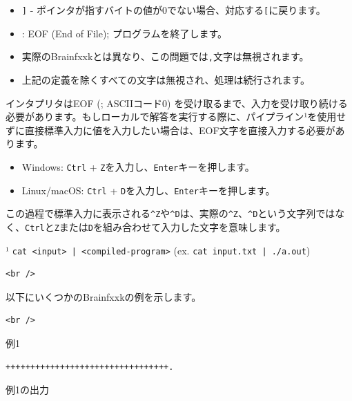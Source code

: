 \begin{enumerate}
\begin{itemize}
\item 
\texttt{]} - ポインタが指すバイトの値が0でない場合、対応する\texttt{[}に戻ります。


\item 
\texttt{\0} : EOF (End of File); プログラムを終了します。


\item 
実際のBrainfxxkとは異なり、この問題では\texttt{,}文字は無視されます。


\item 
上記の定義を除くすべての文字は無視され、処理は続行されます。


\end{itemize}

\end{enumerate}

インタプリタはEOF (\texttt{\0}; ASCIIコード0) を受け取るまで、入力を受け取り続ける必要があります。もしローカルで解答を実行する際に、パイプライン¹を使用せずに直接標準入力に値を入力したい場合は、EOF文字を直接入力する必要があります。

\begin{itemize}
\item 
Windows: \texttt{Ctrl} + \texttt{Z}を入力し、\texttt{Enter}キーを押します。


\item 
Linux/macOS: \texttt{Ctrl} + \texttt{D}を入力し、\texttt{Enter}キーを押します。


\end{itemize}

この過程で標準入力に表示される\texttt{^Z}や\texttt{^D}は、実際の\texttt{^Z}、\texttt{^D}という文字列ではなく、\texttt{Ctrl}と\texttt{Z}または\texttt{D}を組み合わせて入力した文字を意味します。


¹ \texttt{cat <input> | <compiled-program>} (ex. \texttt{cat input.txt | ./a.out})

\begin{lstlisting}
<br />
\end{lstlisting}

以下にいくつかのBrainfxxkの例を示します。

\begin{lstlisting}
<br />
\end{lstlisting}

例1

\begin{lstlisting}
+++++++++++++++++++++++++++++++++.
\end{lstlisting}

例1の出力

